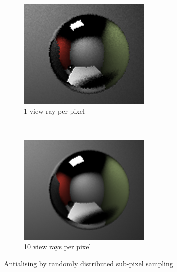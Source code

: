 \documentclass[a4paper, 12pt]{report}
\begin{document}
\begin{figure}
        \centering
        \begin{subfigure}[b]{0.3\textwidth}
                \includegraphics[width=\textwidth]{figures/aliasing_1.png}
                \caption{1 view ray per pixel}
                \label{fig:aliasing1}
        \end{subfigure}%
        ~ %
        \begin{subfigure}[b]{0.3\textwidth}
                \includegraphics[width=\textwidth]{figures/aliasing_10.png}
                \caption{10 view rays per pixel}
                \label{fig:aliasing10}
        \end{subfigure}
        \caption{Antialising by randomly distributed sub-pixel sampling}\label{fig:antialiasing}
\end{figure}
\end{document}
